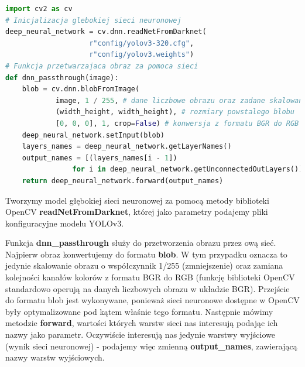 \begin{lstlisting}[language=Python, caption=Przetworzenie obrazu za pomocą głębokiej sieci neuronowej]
import cv2 as cv
# Inicjalizacja glebokiej sieci neuronowej
deep_neural_network = cv.dnn.readNetFromDarknet(
                    r"config/yolov3-320.cfg", 
                    r"config/yolov3.weights")
# Funkcja przetwarzajaca obraz za pomoca sieci            
def dnn_passthrough(image):
    blob = cv.dnn.blobFromImage(
            image, 1 / 255, # dane liczbowe obrazu oraz zadane skalowanie
            (width_height, width_height), # rozmiary powstalego blobu
            [0, 0, 0], 1, crop=False) # konwersja z formatu BGR do RGB
    deep_neural_network.setInput(blob)
    layers_names = deep_neural_network.getLayerNames()
    output_names = [(layers_names[i - 1]) 
                for i in deep_neural_network.getUnconnectedOutLayers()]
    return deep_neural_network.forward(output_names)
\end{lstlisting}

Tworzymy model głębokiej sieci neuronowej za pomocą metody biblioteki OpenCV \textbf{readNetFromDarknet}, której jako parametry podajemy pliki konfiguracyjne modelu YOLOv3. 

Funkcja \textbf{dnn\_passthrough} służy do przetworzenia obrazu przez ową sieć. Najpierw obraz konwertujemy do formatu \textbf{blob}. W tym przypadku oznacza to jedynie skalowanie obrazu o współczynnik 1/255 (zmniejszenie) oraz zamiana kolejności kanałów kolorów z formatu BGR do RGB (funkcję biblioteki OpenCV standardowo operują na danych liczbowych obrazu w układzie BGR). Przejście do formatu blob jest wykonywane, ponieważ sieci neuronowe dostępne w OpenCV były optymalizowane pod kątem właśnie tego formatu. Następnie mówimy metodzie \textbf{forward}, wartości których warstw sieci nas interesują podając ich nazwy jako parametr. Oczywiście interesują nas jedynie warstwy wyjściowe (wynik sieci neuronowej) - podajemy więc zmienną \textbf{output\_names}, zawierającą nazwy warstw wyjściowych.

